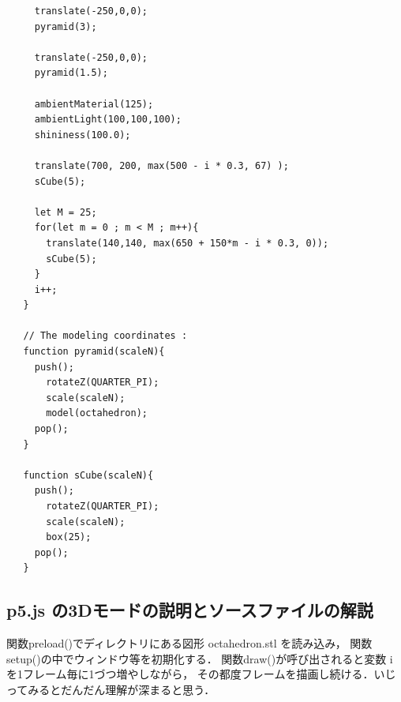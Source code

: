 \begin{verbatim}
     translate(-250,0,0);
     pyramid(3);
   
     translate(-250,0,0);
     pyramid(1.5);
   
     ambientMaterial(125);
     ambientLight(100,100,100);
     shininess(100.0);
   
     translate(700, 200, max(500 - i * 0.3, 67) );
     sCube(5);
     
     let M = 25;
     for(let m = 0 ; m < M ; m++){
       translate(140,140, max(650 + 150*m - i * 0.3, 0));
       sCube(5);
     }  
     i++; 
   }
   
   // The modeling coordinates :
   function pyramid(scaleN){
     push();
       rotateZ(QUARTER_PI);
       scale(scaleN);
       model(octahedron);
     pop();
   }
   
   function sCube(scaleN){
     push();
       rotateZ(QUARTER_PI);
       scale(scaleN);
       box(25);
     pop();
   }
\end{verbatim}


\subsection{p5.js の3Dモードの説明とソースファイルの解説}
関数preload()でディレクトリにある図形 octahedron.stl を読み込み，
関数setup()の中でウィンドウ等を初期化する．
関数draw()が呼び出されると変数 i を1フレーム毎に1づつ増やしながら，
その都度フレームを描画し続ける．いじってみるとだんだん理解が深まると思う．

\emptyline

